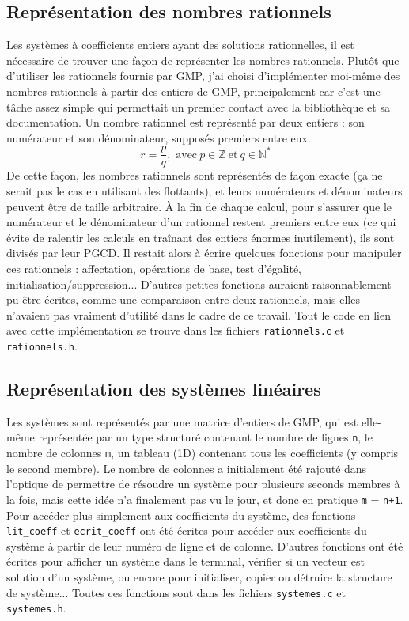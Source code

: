 \documentclass[french]{article}
\begin{document}
\subsection{Représentation des nombres rationnels}
Les systèmes à coefficients entiers ayant des solutions rationnelles, il est nécessaire de trouver une façon de représenter les nombres rationnels. Plutôt que d'utiliser les rationnels fournis par GMP, j'ai choisi d'implémenter moi-même des nombres rationnels à partir des entiers de GMP, principalement car c'est une tâche assez simple qui permettait un premier contact avec la bibliothèque et sa documentation.
Un nombre rationnel est représenté par deux entiers : son numérateur et son dénominateur, supposés premiers entre eux. 
$$r = \frac{p}{q}, \mbox{ avec} \ p \in \mathbb{Z}\ \mbox{et} \ q \in \mathbb{N}^*$$
De cette façon, les nombres rationnels sont représentés de façon exacte (ça ne serait pas le cas en utilisant des flottants), et leurs numérateurs et dénominateurs peuvent être de taille arbitraire.
À la fin de chaque calcul, pour s'assurer que le numérateur et le dénominateur d'un rationnel restent premiers entre eux (ce qui évite de ralentir les calculs en traînant des entiers énormes inutilement), ils sont divisés par leur PGCD.
Il restait alors à écrire quelques fonctions pour manipuler ces rationnels : affectation, opérations de base, test d'égalité, initialisation/suppression... D'autres petites fonctions auraient raisonnablement pu être écrites, comme une comparaison entre deux rationnels, mais elles n'avaient pas vraiment d'utilité dans le cadre de ce travail.
Tout le code en lien avec cette implémentation se trouve dans les fichiers {\tt rationnels.c} et {\tt rationnels.h}.
\subsection{Représentation des systèmes linéaires} \label{subsec:systemes}
Les systèmes sont représentés par une matrice d'entiers de GMP, qui est elle-même représentée par un type structuré contenant le nombre de lignes {\tt n}, le nombre de colonnes {\tt m}, un tableau (1D) contenant tous les coefficients (y compris le second membre). Le nombre de colonnes a initialement été rajouté dans l'optique de permettre de résoudre un système pour plusieurs seconds membres à la fois, mais cette idée n'a finalement pas vu le jour, et donc en pratique {\tt m} = {\tt n+1}.
Pour accéder plus simplement aux coefficients du système, des fonctions {\tt lit\_coeff} et {\tt ecrit\_coeff} ont été écrites pour accéder aux coefficients du système à partir de leur numéro de ligne et de colonne.
D'autres fonctions ont été écrites pour afficher un système dans le terminal, vérifier si un vecteur est solution d'un système, ou encore pour initialiser, copier ou détruire la structure de système... Toutes ces fonctions sont dans les fichiers {\tt systemes.c} et {\tt systemes.h}.
\end{document}
